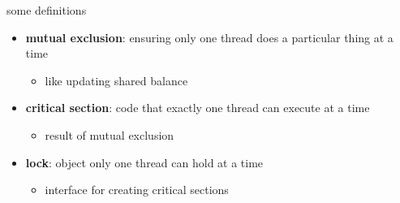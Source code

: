 \begin{frame}{some definitions}
\begin{itemize}
\item \textbf{mutual exclusion}: ensuring only one thread does a particular thing at a time
    \begin{itemize}
        \item like updating shared balance
    \end{itemize}
\item<2-> \textbf{critical section}: code that exactly one thread can execute at a time
    \begin{itemize}
        \item result of mutual exclusion
    \end{itemize}
\item<3-> \textbf{lock}: object only one thread can hold at a time
    \begin{itemize}
        \item interface for creating critical sections
    \end{itemize}
\end{itemize}
\end{frame}
